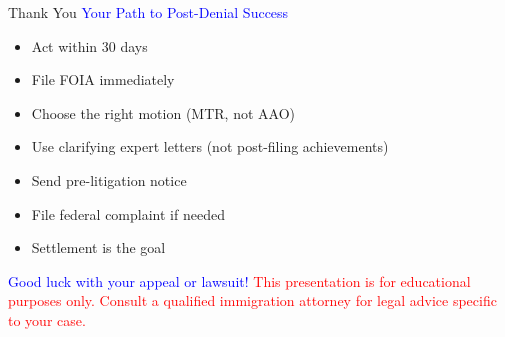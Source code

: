 \documentclass[11pt]{beamer}
\begin{document}
	\begin{frame}{Thank You}
		\centering
		\vspace{1cm}
		\textcolor{blue}{\Large Your Path to Post-Denial Success}
		\vspace{0.5cm}
		\begin{itemize}
			\item Act within 30 days
			\item File FOIA immediately
			\item Choose the right motion (MTR, not AAO)
			\item Use clarifying expert letters (not post-filing achievements)
			\item Send pre-litigation notice
			\item File federal complaint if needed
			\item Settlement is the goal
		\end{itemize}
		\vspace{0.5cm}
		\textcolor{blue}{\Large Good luck with your appeal or lawsuit!}
		\vspace{0.5cm}
		\textcolor{red}{This presentation is for educational purposes only. Consult a qualified immigration attorney for legal advice specific to your case.}
	\end{frame}
	
\end{document}
